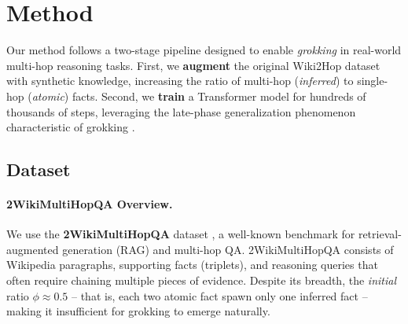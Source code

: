 \section{Method}\label{sec:method}
    
    Our method follows a two-stage pipeline designed to enable \emph{grokking} in real-world multi-hop reasoning tasks. 
    First, we \textbf{augment} the original Wiki2Hop dataset with synthetic knowledge, increasing the ratio of multi-hop (\emph{inferred}) to single-hop (\emph{atomic}) facts. 
    Second, we \textbf{train} a Transformer model for hundreds of thousands of steps, leveraging the late-phase generalization phenomenon characteristic of grokking \citep{power2022grokking, wang_grokked_2024}.
    
    \subsection{Dataset}\label{sec:method_dataset}
    
        \paragraph{2WikiMultiHopQA Overview.}
            We use the \textbf{2WikiMultiHopQA} dataset \citep{ho_2WikiMultiHopQA_2020}, a well-known benchmark for retrieval-augmented generation (RAG) and multi-hop QA. 
            2WikiMultiHopQA consists of Wikipedia paragraphs, supporting facts (triplets), and reasoning queries that often require chaining multiple pieces of evidence.
            Despite its breadth, the \emph{initial} ratio $\phi \approx 0.5$ -- that is, each two atomic fact spawn only one inferred fact -- making it insufficient for grokking to emerge naturally.
            
